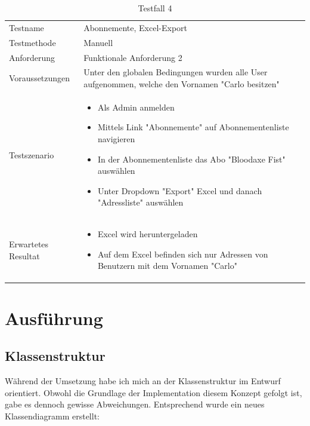 \begin{table}[h!]
   \begin{tabular}{|L{0.4\textwidth}|L{0.6\textwidth}|}
       \hline
         \\[12pt]
       \hline
        Testname & Abonnemente, Excel-Export \\
       \hline
       Testmethode & Manuell \\
       \hline
        Anforderung & Funktionale Anforderung 2 \\
       \hline
       Voraussetzungen & Unter den globalen Bedingungen wurden alle User aufgenommen, welche den Vornamen
       "Carlo besitzen" \\
       \hline
       Testszenario & 
       \begin{itemize}
         \item Als Admin anmelden
         \item Mittels Link "Abonnemente" auf Abonnementenliste navigieren
         \item In der Abonnementenliste das Abo "Bloodaxe Fist" auswählen
         \item Unter Dropdown "Export" Excel und danach "Adressliste" auswählen
       \end{itemize} \\
       \hline
       Erwartetes Resultat & 
       \begin{itemize}
         \item Excel wird heruntergeladen
         \item Auf dem Excel befinden sich nur Adressen von Benutzern mit dem Vornamen "Carlo"
      \end{itemize}\\
      \hline
     \end{tabular}
     \caption{Testfall 4}
\end{table}

\chapter{Ausführung}
\section{Klassenstruktur}
Während der Umsetzung habe ich mich an der Klassenstruktur im Entwurf orientiert. Obwohl die Grundlage der Implementation diesem Konzept
gefolgt ist, gabe es dennoch gewisse Abweichungen. Entsprechend wurde ein neues Klassendiagramm erstellt:

